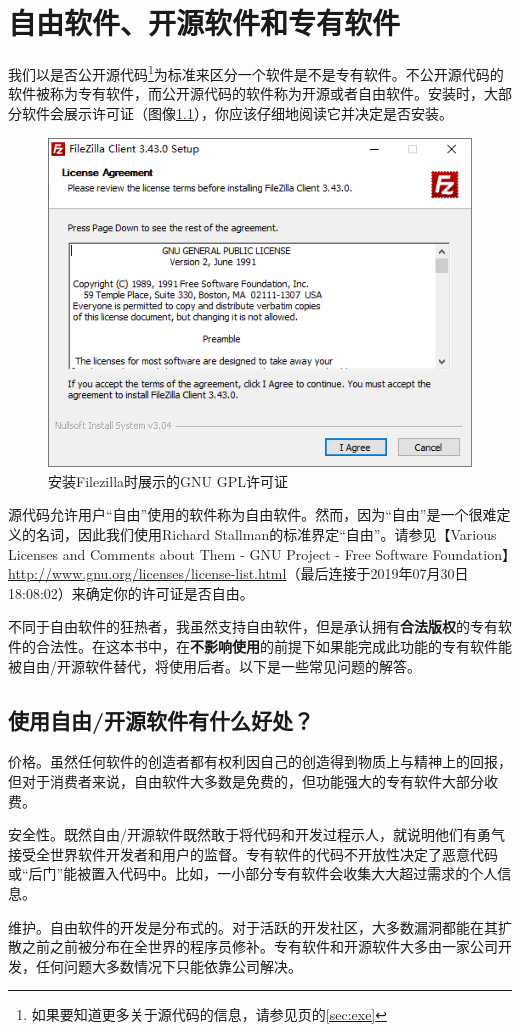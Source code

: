 \chapter{自由软件、开源软件和专有软件}
我们以是否公开源代码\footnote{如果要知道更多关于源代码的信息，请参见\pageref{sec:exe}页的\ref{sec:exe}}为标准来区分一个软件是不是专有软件。不公开源代码的软件被称为专有软件，而公开源代码的软件称为开源或者自由软件。安装时，大部分软件会展示许可证（图像\ref{Fig:FileZillaGPL}），你应该仔细地阅读它并决定是否安装。
\begin{figure}[h]
\centering
	\includegraphics[width=0.7\linewidth]{pic/fzi}
	\caption{安装Filezilla时展示的GNU GPL许可证}
	\label{Fig:FileZillaGPL}
\end{figure}
源代码允许用户“自由”使用的软件称为自由软件。然而，因为“自由”是一个很难定义的名词，因此我们使用Richard Stallman的标准界定“自由”\cite{Whats-Free-Software}。请参见【Various Licenses and Comments about Them - GNU Project - Free Software Foundation】\url{http://www.gnu.org/licenses/license-list.html}（最后连接于2019年07月30日18:08:02）来确定你的许可证是否自由。\par
不同于自由软件的狂热者，我虽然支持自由软件，但是承认拥有\textbf{合法版权}的专有软件的合法性。在这本书中，在\textbf{不影响使用}的前提下如果能完成此功能的专有软件能被自由/开源软件替代，将使用后者。以下是一些常见问题的解答。
\section{使用自由/开源软件有什么好处？}
价格。虽然任何软件的创造者都有权利因自己的创造得到物质上与精神上的回报，但对于消费者来说，自由软件大多数是免费的，但功能强大的专有软件大部分收费。\par
安全性。既然自由/开源软件既然敢于将代码和开发过程示人，就说明他们有勇气接受全世界软件开发者和用户的监督。专有软件的代码不开放性决定了恶意代码或“后门”能被置入代码中。比如，一小部分专有软件会收集大大超过需求的个人信息。\par
维护。自由软件的开发是分布式的。对于活跃的开发社区，大多数漏洞都能在其扩散之前之前被分布在全世界的程序员修补。专有软件和开源软件大多由一家公司开发，任何问题大多数情况下只能依靠公司解决。
